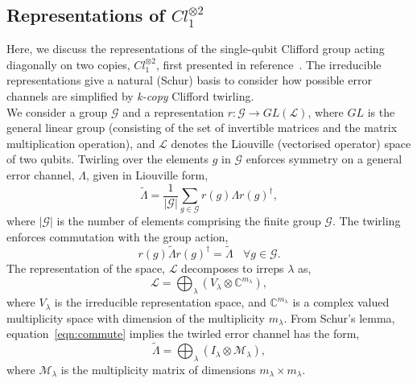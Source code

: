 \subsection{Representations of $Cl_1^{\otimes2}$}
\label{app:reps}
Here, we discuss the representations of the single-qubit Clifford group
acting diagonally on two copies, $Cl_1^{\otimes2}$, first presented in 
reference~\cite{helsen_representations_2018}. The irreducible
representations give a natural (Schur) basis to consider how possible error
channels are simplified by \emph{k-copy} Clifford twirling. \\
We consider a group $\mathcal{G}$ and a representation $r:\mathcal{G}\rightarrow GL(\mathcal{L})$, where $GL$ is the general linear group (consisting of the set of invertible matrices and the matrix multiplication operation), and $\mathcal{L}$
denotes the Liouville (vectorised operator) space of two qubits.
Twirling over the elements $g$ in $\mathcal{G}$ enforces symmetry on a general error channel, $\Lambda$, given in Liouville form,
\begin{equation}\label{eqn:twirl}
    \tilde\Lambda=\frac{1}{|\mathcal{G}|}\sum_{g\in \mathcal{G}}r(g)\Lambda r(g)^\dagger,
\end{equation}
where $|\mathcal{G}|$ is the number of elements comprising the finite group $\mathcal{G}$.
The twirling enforces commutation with the group action,
\begin{equation}\label{eqn:commute}
    r(g)\tilde\Lambda r(g)^\dagger=\tilde\Lambda~~~~\forall g \in \mathcal{G}.
\end{equation}
The representation of the space, $\mathcal{L}$ decomposes to irreps $\lambda$ as,
\begin{equation}
    \mathcal{L}=\bigoplus_\lambda(V_\lambda\otimes \mathbb{C}^{m_\lambda}),
\end{equation}
where $V_\lambda$ is the irreducible representation space, and $\mathbb{C}^{m_\lambda}$ is a complex valued multiplicity space with dimension of the multiplicity $m_\lambda$.
From Schur's lemma, equation~\ref{eqn:commute} implies the twirled error channel has the form,
\begin{equation}\label{eqn:block-diag}
    \tilde\Lambda=\bigoplus_\lambda(I_\lambda\otimes \mathcal M_{\lambda}),
\end{equation}
where $\mathcal{M}_\lambda$ is the multiplicity matrix of dimensions $m_\lambda\times m_\lambda.$\\
